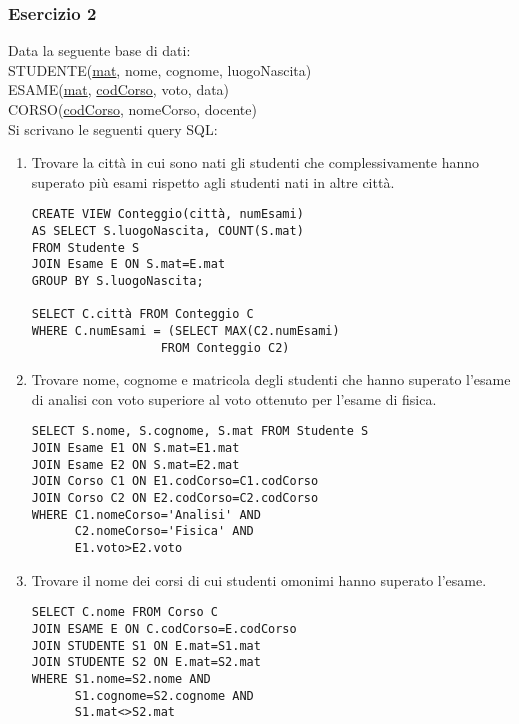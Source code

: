 \documentclass[a4paper]{article}
\begin{document}
\subsubsection{Esercizio 2}
Data la seguente base di dati:\medskip\\
STUDENTE(\underline{mat}, nome, cognome, luogoNascita)\\
ESAME(\underline{mat}, \underline{codCorso}, voto, data)\\
CORSO(\underline{codCorso}, nomeCorso, docente)\medskip\\
Si scrivano le seguenti query SQL:
\begin{enumerate}
\item Trovare la città in cui sono nati gli studenti che complessivamente hanno superato più esami rispetto agli studenti nati in altre città.
\begin{verbatim}
CREATE VIEW Conteggio(città, numEsami)
AS SELECT S.luogoNascita, COUNT(S.mat)
FROM Studente S
JOIN Esame E ON S.mat=E.mat
GROUP BY S.luogoNascita;

SELECT C.città FROM Conteggio C
WHERE C.numEsami = (SELECT MAX(C2.numEsami)
                  FROM Conteggio C2)
\end{verbatim}
\item Trovare nome, cognome e matricola degli studenti che hanno superato l'esame di analisi con voto superiore al voto ottenuto per l'esame di fisica.
\begin{verbatim}
SELECT S.nome, S.cognome, S.mat FROM Studente S
JOIN Esame E1 ON S.mat=E1.mat
JOIN Esame E2 ON S.mat=E2.mat
JOIN Corso C1 ON E1.codCorso=C1.codCorso
JOIN Corso C2 ON E2.codCorso=C2.codCorso
WHERE C1.nomeCorso='Analisi' AND
      C2.nomeCorso='Fisica' AND
      E1.voto>E2.voto
\end{verbatim}
\item Trovare il nome dei corsi di cui studenti omonimi hanno superato l'esame.
\begin{verbatim}
SELECT C.nome FROM Corso C
JOIN ESAME E ON C.codCorso=E.codCorso
JOIN STUDENTE S1 ON E.mat=S1.mat
JOIN STUDENTE S2 ON E.mat=S2.mat
WHERE S1.nome=S2.nome AND
      S1.cognome=S2.cognome AND
      S1.mat<>S2.mat
\end{verbatim}
\end{enumerate}
\end{document}

